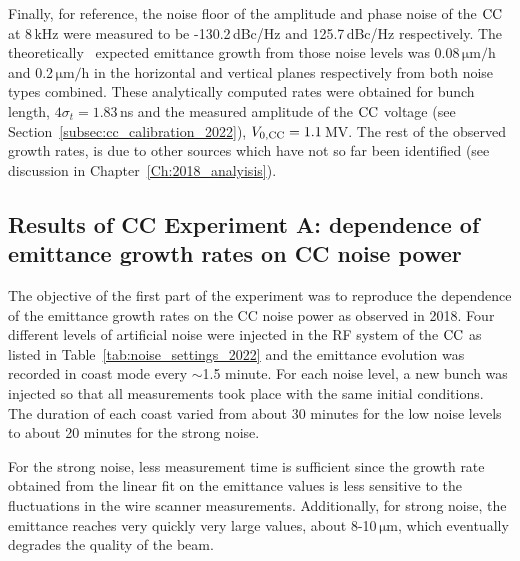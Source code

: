 Finally, for reference, the noise floor of the amplitude and phase noise of the ${\mathrm{CC}}$ at 8\,kHz were measured to be -130.2\,dBc/Hz and 125.7\,dBc/Hz respectively. The theoretically~\cite{PhysRevSTAB.18.101001} expected emittance growth from those noise levels was 0.08\,$\mathrm{\mu m/h}$ and 0.2\,$\mathrm{\mu m/h}$ in the horizontal and vertical planes respectively from both noise types combined. These analytically computed rates were obtained for bunch length, $4\sigma_t=1.83$\,ns and the measured amplitude of the ${\mathrm{CC}}$ voltage (see Section~\ref{subsec:cc_calibration_2022}), ${V_\mathrm{0, CC}}=1.1$\,MV.
The rest of the observed growth rates, is due to other sources which have not so far been identified (see discussion in Chapter~\ref{Ch:2018_analyisis}).


\subsection{Results of CC Experiment A: dependence of emittance growth rates on CC noise power}\label{subsec:cc_md_2022_noise_scan}

The objective of the first part of the experiment was to reproduce the dependence of the emittance growth rates on the CC noise power as observed in 2018. Four different levels of artificial noise were injected in the RF system of the ${\mathrm{CC}}$ as listed in Table~\ref{tab:noise_settings_2022} and the emittance evolution was recorded in coast mode every $\sim$1.5 minute. For each noise level, a new bunch was injected so that all measurements took place with the same initial conditions. The duration of each coast varied from about 30 minutes for the low noise levels to about 20 minutes for the strong noise. 

For the strong noise, less measurement time is sufficient since the growth rate obtained from the linear fit on the emittance values is less sensitive to the fluctuations in the wire scanner measurements. Additionally, for strong noise, the emittance reaches very quickly very large values, about 8-10\,$\mathrm{\mu m}$, which eventually degrades the quality of the beam.

